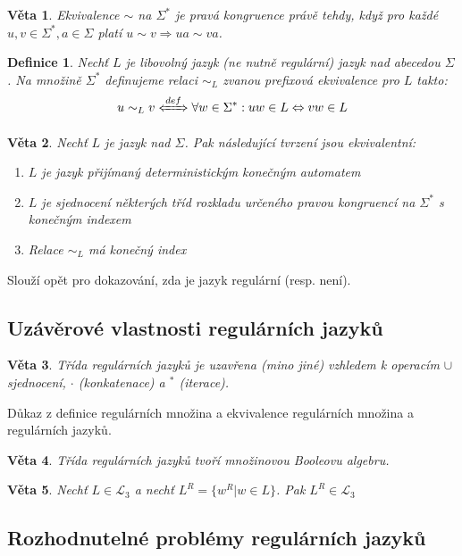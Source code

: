 \documentclass[a4paper, 11pt]{report}
\newtheorem{mydef}{Definice}[chapter]
\newtheorem{veta}{Věta}[chapter]
\begin{document}
\begin{veta}
Ekvivalence $\sim$ na $\Sigma^*$ je pravá kongruence právě tehdy, když pro každé $u,v \in \Sigma^*, a \in \Sigma$ platí $u \sim v \Rightarrow ua \sim va$.
\end{veta}

\begin{mydef}
Nechť $L$ je libovolný jazyk (ne nutně regulární) jazyk nad abecedou $\Sigma$. Na množině $\Sigma^*$ definujeme relaci $\sim_L$ zvanou prefixová ekvivalence pro $L$ takto:
$$u \sim_L v \xLeftrightarrow{def} \forall w \in \Sigma^*: uw \in L \Leftrightarrow vw \in L$$
\end{mydef}

\begin{veta}
Nechť $L$ je jazyk nad $\Sigma$. Pak následující tvrzení jsou ekvivalentní:
\begin{enumerate}
	\item $L$ je jazyk přijímaný deterministickým konečným automatem
	\item $L$ je sjednocení některých tříd rozkladu určeného pravou kongruencí na $\Sigma^*$ s konečným indexem
	\item Relace $\sim_L$ má konečný index
\end{enumerate}
\end{veta}

Slouží opět pro dokazování, zda je jazyk regulární (resp. není).

\subsection{Uzávěrové vlastnosti regulárních jazyků}

\begin{veta}
Třída regulárních jazyků \emph{je uzavřena} (mino jiné) vzhledem k operacím $\cup$ sjednocení, $\cdot$ (konkatenace) a $^*$ (iterace).
\end{veta}
Důkaz z definice regulárních množina a ekvivalence regulárních množina a regulárních jazyků.

\begin{veta}
Třída regulárních jazyků tvoří množinovou \emph{Booleovu algebru}.
\end{veta}

\begin{veta}
Nechť $L \in \mathcal{L}_3$ a nechť $L^R = \{w^R | w \in L\}$. Pak $L^R \in \mathcal{L}_3$
\end{veta}

\subsection{Rozhodnutelné problémy regulárních jazyků}
\end{document}
